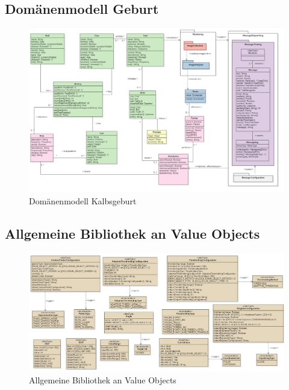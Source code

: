 \begin{landscape}

\subsection{Domänenmodell Geburt}
\begin{figure}[H]
	\center
	\includegraphics[scale=0.38]{Grafiken/modelle/domain-birth.jpg}
	\caption{Domänenmodell Kalbsgeburt} 
	\label{fig: Domänenmodell Kalbsgeburt}
\end{figure}


\subsection{Allgemeine Bibliothek an Value Objects }


\begin{figure}[H]
	\center
	\includegraphics[scale=1.8]{Grafiken/modelle/vo-general2.jpg}
	\caption{Allgemeine Bibliothek an Value Objects}
	\label{fig: Allgemeine Bibliothek an Value Objects} 
\end{figure}


\end{landscape}
